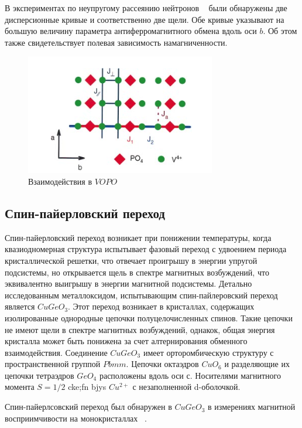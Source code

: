 \documentclass[11pt]{article}
\begin{document}
В экспериментах по неупругому рассеянию нейтронов ~\cite{garrett1997} были обнаружены две дисперсионные кривые и соответственно две щели. Обе кривые указывают на большую величину параметра антиферромагнитного обмена вдоль оси $b$. Об этом также свидетельствует полевая зависимость намагниченности.

\begin{figure}[htp]
\centering
\includegraphics[scale=0.8]{VO2P2O7_1}
\caption {Взаимодействия в $VOPO$  ~\cite{garrett1997}}
\label{}
\end{figure}


\subsection{Спин-пайерловский переход}
Спин-пайерловский переход возникает при понижении температуры, когда квазиодномерная структура испытывает фазовый переход с удвоением периода кристаллической решетки, что отвечает проигрышу в энергии упругой подсистемы, но открывается щель в спектре магнитных возбуждений, что эквивалентно выигрышу в энергии магнитной подсистемы. Детально исследованным металлоксидом, испытывающим спин-пайлеровский переход является $CuGeO_3$. Этот переход возникает в кристаллах, содержащих изолированные однородные цепочки полуцелочисленных спинов. Такие цепочки не имеют щели в спектре магнитных возбуждений, однакок, общая энергия кристалла может быть понижена за счет алтернирования обменного взаимодействия.
Соединение $CuGeO_3$ имеет орторомбическую структуру с пространственной группой $Pbmm$. Цепочки октаэдров $CuO_6$ и разделяющие их цепочки тетраэдров $GeO_4$ расположены вдоль оси $с$. Носителями магнитного момента $S=1/2$ cke;fn bjys $Cu^{2+}$  с незаполненной d-оболочкой. ~\cite{nm}

Спин-пайерлсовский переход был обнаружен в $CuGeO_3$ в измерениях магнитной восприимчивости на монокристаллах ~\cite{hase1993}.
\end{document}
